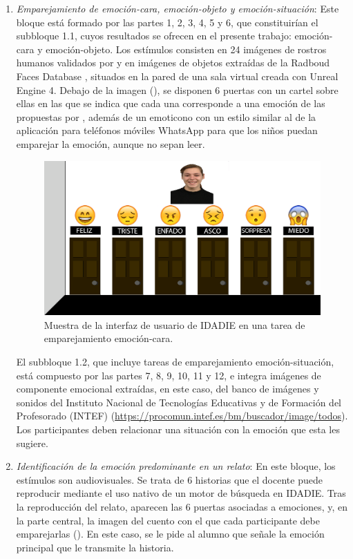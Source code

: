 \documentclass[spanish]{textolivre}
\begin{document}
\begin{enumerate}
    \item \textit{Emparejamiento de emoción-cara, emoción-objeto y emoción-situación}: Este bloque está formado por las partes 1, 2, 3, 4, 5 y 6, que constituirían el subbloque 1.1, cuyos resultados se ofrecen en el presente trabajo: emoción-cara y emoción-objeto. Los estímulos consisten en 24 imágenes de rostros humanos validados por \textcite{ekman_facial_1979} y en imágenes de objetos extraídas de la Radboud Faces Database \cite{langner_presentation_2010}, situados en la pared de una sala virtual creada con Unreal Engine 4. Debajo de la imagen (), se disponen 6 puertas con un cartel sobre ellas en las que se indica que cada una corresponde a una emoción de las propuestas por \textcite{ekman_universal_1970,ekman_que_2003}, además de un emoticono con un estilo similar al de la aplicación para teléfonos móviles WhatsApp para que los niños puedan emparejar la emoción, aunque no sepan leer. 

\begin{figure}[h!]
\centering
\includegraphics[width=0.85\linewidth]{Fig1.png}
\caption{Muestra de la interfaz de usuario de IDADIE en una tarea de emparejamiento emoción-cara.}
\label{fig1}
\end{figure}

El subbloque 1.2, que incluye tareas de emparejamiento emoción-situación, está compuesto por las partes 7, 8, 9, 10, 11 y 12, e integra imágenes de componente emocional extraídas, en este caso, del banco de imágenes y sonidos del Instituto Nacional de Tecnologías Educativas y de Formación del Profesorado (INTEF) (\url{https://procomun.intef.es/bm/buscador/image/todos}). Los participantes deben relacionar una situación con la emoción que esta les sugiere.

\item \textit{Identificación de la emoción predominante en un relato}: En este bloque, los estímulos son audiovisuales. Se trata de 6 historias que el docente puede reproducir mediante el uso nativo de un motor de búsqueda en IDADIE. Tras la reproducción del relato, aparecen las 6 puertas asociadas a emociones, y, en la parte central, la imagen del cuento con el que cada participante debe emparejarlas (). En este caso, se le pide al alumno que señale la emoción principal que le transmite la historia.


\end{enumerate}
\end{document}
